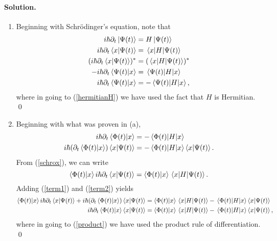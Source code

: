 \documentclass[10pt]{article}
\newcommand{\refeq}[1]{(\ref{#1})}
\newenvironment{solution}
{
    \paragraph{Solution.}
    \ignorespaces
}
{
    \bigskip
}
\newcommand{\Schrodinger}{Schr\"{o}dinger}
\begin{document}
\begin{solution}
	\renewcommand{\theenumi}{\alph{enumi}}
	\begin{enumerate} \label{a}
		\item Beginning with \Schrodinger's equation, note that
			\begin{align}
				i \hbar \partial_t \ket{\Psi(t)} &= H \ket{\Psi(t)} \\
				i \hbar \partial_t \braket{x}{\Psi(t)} &= \mel{x}{H}{\Psi(t)} \label{schrox} \\
				(i \hbar \partial_t \braket{x}{\Psi(t)})^* &= (\mel{x}{H}{\Psi(t)})^* \\
				-i \hbar \partial_t \braket{\Psi(t)}{x} &= \mel{\Psi(t)}{H}{x} \label{hermitianH} \\
				i \hbar \partial_t \braket{\Psi(t)}{x} &= -\mel{\Psi(t)}{H}{x},
			\end{align}
			where in going to \refeq{hermitianH} we have used the fact that $H$ is Hermitian. \qed
			
		\item Beginning with what was proven in (a),
			\begin{align}
				i \hbar \partial_t \braket{\Phi(t)}{x} &= -\mel{\Phi(t)}{H}{x} \\
				i \hbar (\partial_t \braket{\Phi(t)}{x}) \braket{x}{\Psi(t)} &= -\mel{\Phi(t)}{H}{x} \braket{x}{\Psi(t)}. \label{term1}
			\end{align}
			From \refeq{schrox}, we can write
			\begin{equation}
				\braket{\Phi(t)}{x} i \hbar \partial_t \braket{x}{\Psi(t)} = \braket{\Phi(t)}{x} \mel{x}{H}{\Psi(t)}. \label{term2}
			\end{equation}
			Adding \refeq{term1} and \refeq{term2} yields
			\begin{align}
				\braket{\Phi(t)}{x} i \hbar \partial_t \braket{x}{\Psi(t)} + i \hbar (\partial_t \braket{\Phi(t)}{x}) \braket{x}{\Psi(t)} &= \braket{\Phi(t)}{x} \mel{x}{H}{\Psi(t)} - \mel{\Phi(t)}{H}{x} \braket{x}{\Psi(t)} \\
				i \hbar \partial_t \braket{\Phi(t)}{x} \braket{x}{\Psi(t)} &= \braket{\Phi(t)}{x} \mel{x}{H}{\Psi(t)} - \mel{\Phi(t)}{H}{x} \braket{x}{\Psi(t)} \label{product},
			\end{align}
			where in going to \refeq{product} we have used the product rule of differentiation. \qed
	\end{enumerate}
\end{solution}
\end{document}
